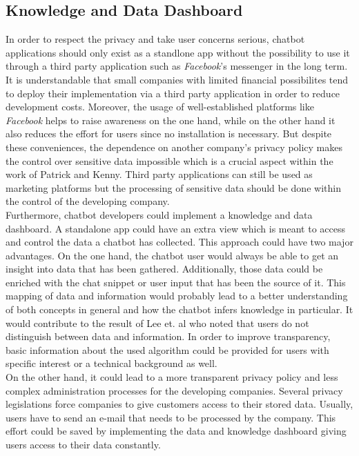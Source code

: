 \documentclass[sigconf, nonacm]{acmart}
\begin{document}
\subsection{Knowledge and Data Dashboard}
\label{sec:four_one}
In order to respect the privacy and take user concerns serious, chatbot applications should only exist as a standlone app without the possibility to use it through a third party application such as \emph{Facebook}'s messenger in the long term. It is understandable that small companies with limited
financial possibilites tend to deploy their implementation via a third party application in order to reduce development costs. Moreover, the usage of well-established platforms like \emph{Facebook} helps to raise awareness on the one hand, while on the other hand it also reduces the effort for users since no installation is necessary. 
But despite these conveniences, the dependence on another company's privacy policy makes the control over sensitive data impossible which is a crucial aspect within the 
work of Patrick and Kenny\cite{Patrick2003}. Third party applications can still be used as marketing platforms but the processing of sensitive data should be done within the control of the developing company.
\\
Furthermore, chatbot developers could implement a knowledge and data dashboard. A standalone app could have an extra view which is meant to access and control the data a chatbot has collected.
This approach could have two major advantages. On the one hand, the chatbot user would always be able to get an insight into data that has been gathered. Additionally, those data could be enriched with the chat snippet or user input that has been the source of it. 
This mapping of data and information would probably lead to a better understanding of both concepts in general and how the chatbot infers knowledge in particular. It would contribute to the result of Lee et. al \cite{Lee2011} who noted that users do not distinguish between data and information.
In order to improve transparency, basic information about the used algorithm could be provided for users with specific interest or a technical background as well.
\\
On the other hand, it could lead to a more transparent privacy policy and less complex administration processes for the developing companies. Several privacy legislations force companies to give customers access to their stored data. Usually, users have to send an e-mail that needs to be processed by the company. This effort could be saved by
implementing the data and knowledge dashboard giving users access to their data constantly.
\end{document}
